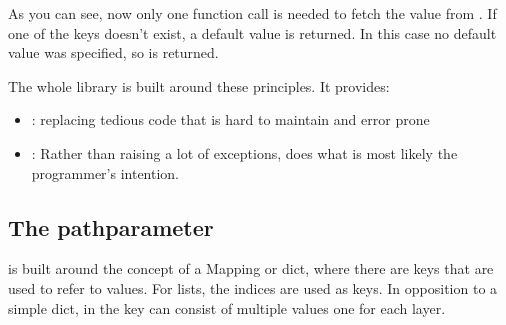 \documentclass[a4paper,10pt,english]{sphinxmanual}
\begin{document}
\sphinxAtStartPar
As you can see, now only one function call is needed to fetch the value from . If one of the keys doesn’t exist, a default value is returned. In this case no default value was specified, so  is returned.

\sphinxAtStartPar
The whole  library is built around these principles. It provides:
\begin{itemize}
\item {}
\sphinxAtStartPar
{}: replacing tedious code that is hard to maintain and error prone

\item {}
\sphinxAtStartPar
{}: Rather than raising a lot of exceptions,  does what is most likely the programmer’s intention.

\end{itemize}


\subsection{The path\sphinxhyphen{}parameter}
\label{\detokenize{README:the-path-parameter}}
\sphinxAtStartPar
{} is built around the concept of a Mapping or dict, where there are keys that are used to refer to values. For lists, the indices are used as keys. In opposition to a simple dict, in  the key can consist of multiple values \textendash{} one for each layer.
\end{document}
